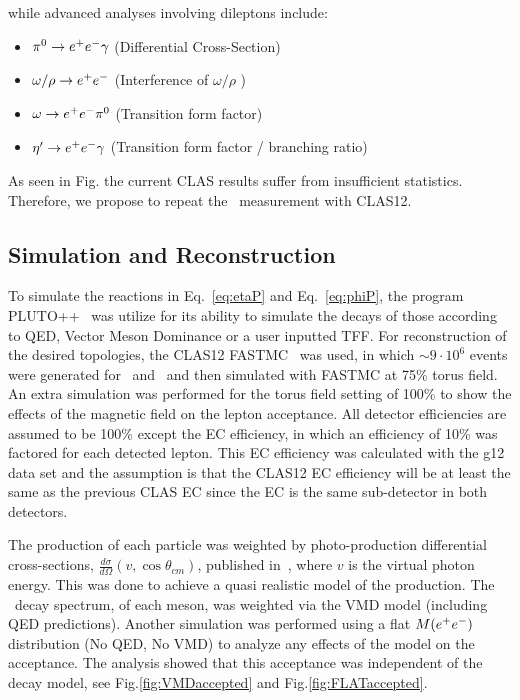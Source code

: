 while advanced analyses involving dileptons include:
\begin{itemize}
\item $\pi^{0} \to e^+e^- \gamma$ (Differential Cross-Section)
\item $\omega / \rho \to e^+e^-$ (Interference of $\omega/\rho$ )
\item $\omega \to e^+e^- \pi^{0}$ (Transition form factor)
\item $\eta^{\prime} \to e^+e^- \gamma$ (Transition form factor / branching ratio)
\end{itemize}
As seen in Fig. the current CLAS results suffer from insufficient statistics. Therefore, we propose to repeat the \etaPDal \  measurement with CLAS12.
\subsection{Simulation and Reconstruction}
To simulate the reactions in Eq.~\ref{eq:etaP} and Eq.~\ref{eq:phiP}, the program PLUTO++~\cite{PLUTO} was utilize for its ability to simulate the decays of those according to QED, Vector Meson Dominance or a user inputted TFF. For reconstruction of the desired topologies, the CLAS12 FASTMC~\cite{fastmc} was used, in which $\sim 9\cdot10^6$ events were generated for \etaPDal \ and \phiDal \ and then simulated with FASTMC at 75\% torus field. An extra simulation was performed for the torus field setting of 100\% to show the effects of the magnetic field on the lepton acceptance. All detector efficiencies are assumed to be 100\% except the EC efficiency, in which an efficiency of 10\% was factored for each detected lepton. This EC efficiency was calculated with the g12 data set and the assumption is that the CLAS12 EC efficiency will be at least the same as the previous CLAS EC since the EC is the same sub-detector in both detectors.

\indent The production of each particle was weighted by photo-production 
differential cross-sections, $\frac{d\sigma}{d\Omega}(v,\cos\theta_{cm})$, published in~\cite{Williams}, where $v$ is the virtual photon energy. This was done to achieve a quasi realistic model of the production. The \epemT \  decay spectrum, of each meson, was weighted via the VMD model (including QED predictions). Another simulation was performed using a flat $M(e^+e^-)$ distribution (No QED, No VMD) to analyze any effects of the model on the \epemT acceptance. The analysis showed that this acceptance was independent of the decay model, see Fig.\ref{fig:VMDaccepted} and Fig.\ref{fig:FLATaccepted}.
